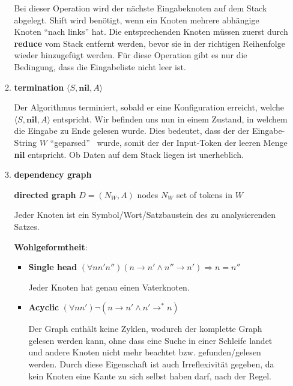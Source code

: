 \documentclass[a4paper]{scrartcl}
\begin{document}
\begin{enumerate}
\begin{enumerate}[label=(\alph*)]
{            Bei dieser Operation wird der nächste Eingabeknoten auf dem Stack abgelegt. Shift wird benötigt, wenn ein Knoten mehrere abhängige Knoten "`nach links"' hat. Die entsprechenden Knoten müssen zuerst durch \textbf{reduce} vom Stack entfernt werden, bevor sie in der richtigen Reihenfolge wieder hinzugefügt werden. Für diese Operation gibt es nur die Bedingung, dass die Eingabeliste nicht leer ist.
        }
			
            \item
            {
            \textbf{termination} $\langle S, \textbf{nil}, A \rangle$
            
            Der Algorithmus terminiert, sobald er eine Konfiguration erreicht, welche $\langle S, \textbf{nil}, A \rangle$ entspricht. Wir befinden uns nun in einem Zustand, in welchem die Eingabe zu Ende gelesen wurde. Dies bedeutet, dass der der Eingabe-String $W$ "`geparsed"' \ wurde, somit der der Input-Token der leeren Menge \textbf{nil} entspricht. Ob Daten auf dem Stack liegen ist unerheblich.
	        }

            \item
            {
            \textbf{dependency graph}
            
            \textbf{directed graph} $D = (N_W, A)$
            nodes $N_W$ set of tokens in $W$
            
            Jeder Knoten ist ein Symbol/Wort/Satzbaustein des zu analysierenden Satzes.
            
            \textbf{Wohlgeformtheit}: \\
            \begin{itemize}
           
            \item {\textbf{Single head}  $(\forall n n' n'') (n \rightarrow n' \land n'' \rightarrow n') \Rightarrow n = n''$
            
            Jeder Knoten hat genau einen Vaterknoten.
	        }
            
            \item {\textbf{Acyclic}      $(\forall n n') \lnot (n \rightarrow n' \land n' \rightarrow^\ast n)$
            
            Der Graph enthält keine Zyklen, wodurch der komplette Graph gelesen werden kann, ohne dass eine Suche in einer Schleife landet und andere Knoten nicht mehr beachtet bzw. gefunden/gelesen werden. Durch diese Eigenschaft ist auch Irreflexivität gegeben, da kein Knoten eine Kante zu sich selbst haben darf, nach der Regel.
	        }
            

\end{itemize}}
\end{enumerate}
\end{enumerate}
\end{document}
